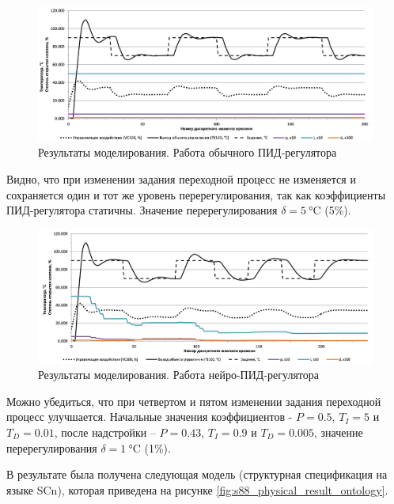 \begin{figure}[H]
    \centering
    \includegraphics[width=\textwidth,height=\textheight,keepaspectratio]{images/chapter_4/Pasteurization_modeling_results_with_typical_PID.png}
    \caption{Результаты моделирования. Работа обычного ПИД-регулятора}
    \label{fig:Pasteurization_modeling_results_with_typical_PID}
\end{figure}

Видно, что при изменении задания переходной процесс не изменяется и сохраняется один и тот же уровень перерегулирования, так как коэффициенты ПИД-регулятора статичны. Значение перерегулирования $\delta = \SI{5}{\celsius}$ (5\%).

\begin{figure}[H]
    \centering
    \includegraphics[width=\textwidth,height=\textheight,keepaspectratio]{images/chapter_4/Pasteurization_modeling_results_with_neuro_PID.png}
    \caption{Результаты моделирования. Работа нейро-ПИД-регулятора}
    \label{fig:Pasteurization_modeling_results_with_neuro_PID}
\end{figure}

Можно убедиться, что при четвертом и пятом изменении задания переходной процесс улучшается. Начальные значения коэффициентов - $P = 0.5$, $T_I = 5$ и $T_D = 0.01$, после надстройки – $P = 0.43$, $T_I = 0.9$ и $T_D = 0.005$, значение перерегулирования $\delta = \SI{1}{\celsius}$ (1\%).

В результате была получена следующая модель (структурная спецификация на языке SCn), которая приведена на рисунке \ref{fig:s88_physical_result_ontology}.

